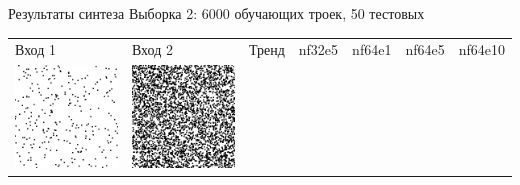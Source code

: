 \documentclass[12pt]{beamer}
\begin{document}
	\begin{frame}{Результаты синтеза}
		Выборка 2: 6000 обучающих троек, 50 тестовых
		\begin{table}
			\begin{center}
				\begin{tabular}{p{1.2cm} p{1.2cm} p{1.2cm} p{1.2cm} p{1.2cm} p{1.2cm} p{1.2cm}}
					\toprule
					Вход 1 & Вход 2 & Тренд & nf32e5 & nf64e1 & nf64e5 & nf64e10 \\
					\cmidrule(r){1-1}\cmidrule(lr){2-2}\cmidrule(lr){3-3}\cmidrule(lr){4-4}\cmidrule(lr){5-5}\cmidrule(lr){6-6}\cmidrule(l){7-7}
					\includegraphics[width=1\linewidth]{8-results/sand-trend8/left1}
					&
					\includegraphics[width=1\linewidth]{8-results/sand-trend8/right1}

\end{tabular}
\end{center}
\end{table}
\end{frame}
\end{document}

